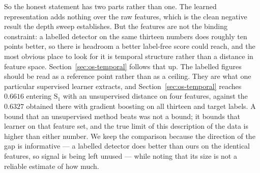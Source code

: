 So the honest statement has two parts rather than one. The learned representation adds
nothing over the raw features, which is the clean negative result the depth sweep
establishes. But the features are not the binding constraint: a labelled detector on the
same thirteen numbers does roughly ten points better, so there is headroom a better
label-free score could reach, and the most obvious place to look for it is temporal
structure rather than a distance in feature space. Section~\ref{sec:os-temporal} follows
that up. The labelled figures should be read as a reference point rather than as a ceiling. They
are what one particular supervised learner extracts, and
Section~\ref{sec:os-temporal} reaches $0.6616$ entering $\text{S}_1$ with an unsupervised
distance on four features, against the $0.6327$ obtained there with gradient boosting on
all thirteen and target labels. A bound that an unsupervised method beats was not a bound;
it bounds that learner on that feature set, and the true limit of this description of the
data is higher than either number. We keep the comparison because the direction of the gap
is informative --- a labelled detector does better than ours on the identical features, so
signal is being left unused --- while noting that its size is not a reliable estimate of
how much.
